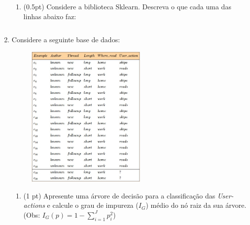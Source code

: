 \documentclass{article}
\begin{document}
\begin{enumerate}
\begin{enumerate}
        \item (0.5pt) Considere a biblioteca Sklearn. Descreva o que cada uma das linhas abaixo faz:
        
        \begin{figure}[!ht]
        \centering
        \inputminted[linenos]{python}{linear.py}
        \label{fig:abduction}
        \end{figure}
        
        
    \end{enumerate}
    
    \item Considere a seguinte base de dados:
    
    \begin{figure}[!ht]
        \centering
        \includegraphics[width=0.55\textwidth]{abc.jpg}
    \end{figure}

    \begin{enumerate}
        \item (1 pt) Apresente uma árvore de decisão para a classificação das \textit{User-actions} e calcule o grau de impureza ($I_G$) médio do nó raiz da sua árvore. (Obs: $I_G(p) = 1 - \sum_{i=1}^{J}p_i^2$)
        
        

\end{enumerate}
\end{enumerate}
\end{document}

